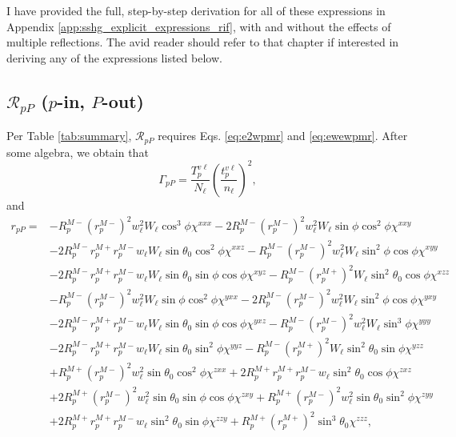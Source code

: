 I have provided the full, step-by-step derivation for all of these expressions
in Appendix \ref{app:sshg_explicit_expressions_rif}, with and without the
effects of multiple reflections. The avid reader should refer to that chapter if
interested in deriving any of the expressions listed below.



\subsection{\texorpdfstring{$\mathcal{R}_{pP}$ ($p$-in, $P$-out)}
{RpP (p-in, P-out)}}
\label{sec:RpP} 

Per Table \ref{tab:summary}, $\mathcal{R}_{pP}$ requires Eqs. \eqref{eq:e2wpmr}
and \eqref{eq:ewewpmr}. After some algebra, we obtain that
\begin{equation}\label{eq:mc78}
\Gamma_{pP} =
\frac{T^{v\ell}_{p}}{N_{\ell}}
\left(\frac{t^{v\ell}_{p}}{n_{\ell}}\right)^{2}
,
\end{equation}
and
\begin{equation}
\begin{split}
r_{pP} =
&-R^{M-}_{p}\left(r^{M-}_{p}\right)^{2}w^{2}_{\ell}W_{\ell}\cos^{3}\phi
\chi^{xxx}
 -2R^{M-}_{p}\left(r^{M-}_{p}\right)^{2}w^{2}_{\ell}W_{\ell}\sin\phi\cos^{2}\phi
\chi^{xxy}\\
&-2R^{M-}_{p}r^{M+}_{p}r^{M-}_{p}w_{\ell}W_{\ell}\sin\theta_{0}\cos^{2}\phi
\chi^{xxz}
 -R^{M-}_{p}\left(r^{M-}_{p}\right)^{2}w^{2}_{\ell}W_{\ell}\sin^{2}\phi\cos\phi
\chi^{xyy}\\
&-2R^{M-}_{p}r^{M+}_{p}r^{M-}_{p}w_{\ell}W_{\ell}\sin\theta_{0}\sin\phi\cos\phi
\chi^{xyz}
 -R^{M-}_{p}\left(r^{M+}_{p}\right)^{2}W_{\ell}\sin^{2}\theta_{0}\cos\phi
\chi^{xzz}\\
&-R^{M-}_{p}\left(r^{M-}_{p}\right)^{2}w^{2}_{\ell}W_{\ell}\sin\phi\cos^{2}\phi
\chi^{yxx}
 -2R^{M-}_{p}\left(r^{M-}_{p}\right)^{2}w^{2}_{\ell}W_{\ell}\sin^{2}\phi\cos\phi
\chi^{yxy}\\
&-2R^{M-}_{p}r^{M+}_{p}r^{M-}_{p}w_{\ell}W_{\ell}\sin\theta_{0}\sin\phi\cos\phi
\chi^{yxz}
 -R^{M-}_{p}\left(r^{M-}_{p}\right)^{2}w^{2}_{\ell}W_{\ell}\sin^{3}\phi
\chi^{yyy}\\
&-2R^{M-}_{p}r^{M+}_{p}r^{M-}_{p}w_{\ell}W_{\ell}\sin\theta_{0}\sin^{2}\phi
\chi^{yyz}
 -R^{M-}_{p}\left(r^{M+}_{p}\right)^{2}W_{\ell}\sin^{2}\theta_{0}\sin\phi
\chi^{yzz}\\
&+R^{M+}_{p}\left(r^{M-}_{p}\right)^{2}w^{2}_{\ell}\sin\theta_{0}\cos^{2}\phi
\chi^{zxx}
 +2R^{M+}_{p}r^{M+}_{p}r^{M-}_{p}w_{\ell}\sin^{2}\theta_{0}\cos\phi
\chi^{zxz}\\
&+2R^{M+}_{p}\left(r^{M-}_{p}\right)^{2}w^{2}_{\ell}\sin\theta_{0}\sin\phi
\cos\phi\chi^{zxy}
 +R^{M+}_{p}\left(r^{M-}_{p}\right)^{2}w^{2}_{\ell}\sin\theta_{0}\sin^{2}\phi
\chi^{zyy}\\
&+2R^{M+}_{p}r^{M+}_{p}r^{M-}_{p}w_{\ell}\sin^{2}\theta_{0}\sin\phi
\chi^{zzy}
 +R^{M+}_{p}\left(r^{M+}_{p}\right)^{2}\sin^{3}\theta_{0}
\chi^{zzz},
\end{split}
\end{equation}
